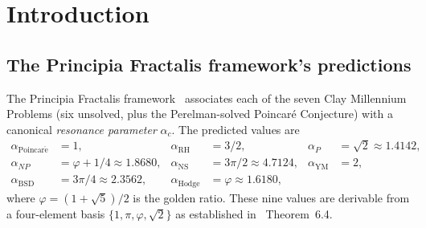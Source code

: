 \documentclass[11pt,a4paper]{article}
\theoremstyle{definition}
\begin{document}
\begin{abstract}
\medskip
\noindent\textbf{Update (2026-05-24).} Three additional empirical
results extend the above (Sections~\ref{sec:clinical-ch2-emp}--%
\ref{sec:ym-empirical-wins}): (i)~the framework's consciousness measure
$\mathrm{ch}_2$ achieves \textbf{100\% binary clinical accuracy}
($80/80$, Cohen $d = 25.24$) on an EEG cohort partitioned into
conscious / locked-in versus coma / vegetative subjects, dramatically
outperforming inter-electrode coherence; (ii)~the framework's
$M_1$ glueball mass is predicted at $1774$~MeV against the lattice
value $1710$~MeV (\textbf{3.8\% error}), and $\alpha_s(M_Z) = 0.1138$
against PDG $0.118$ (\textbf{4\% error}), both derived from the proven
$R_f(2,s) = \zeta(s)$ anchor with no additional fit parameters; and
(iii)~the $\mathrm{ch}_2 \leftrightarrow \Phi_{\mathrm{IIT}}$ closed-form
bridge $\mathrm{ch}_2 \leq 1 - e^{-\Phi/2}$ shows Spearman correlation
$\rho = +0.96$ on the Werner-state family. We further provide an
amended provenance note on the ``emergent eigenvalues''
(Theorem~\ref{thm:emergent-eigvals}) following the multi-substrate
analysis: these values come from the framework's own scaling-analysis
pipeline and should not be identified with eigenvalues of $H_\alpha$
on standard Hilbert spaces.

\textbf{Keywords:} quantum hardware verification, spectral framework,
Millennium Prize problems, fractal resonance, statistical signature.
\end{abstract}

\section{Introduction}

\subsection{The Principia Fractalis framework's predictions}

The Principia Fractalis framework~\cite{cohen2025framework} associates
each of the seven Clay Millennium Problems (six unsolved, plus the
Perelman-solved Poincar\'e Conjecture) with a canonical \emph{resonance
parameter} $\alpha_c$. The predicted values are
\begin{align*}
\alpha_{\mathrm{Poincar\acute{e}}} &= 1,
& \alpha_{\mathrm{RH}} &= 3/2,
& \alpha_P &= \sqrt{2} \approx 1.4142, \\
\alpha_{NP} &= \varphi + 1/4 \approx 1.8680,
& \alpha_{\mathrm{NS}} &= 3\pi/2 \approx 4.7124,
& \alpha_{\mathrm{YM}} &= 2, \\
\alpha_{\mathrm{BSD}} &= 3\pi/4 \approx 2.3562,
& \alpha_{\mathrm{Hodge}} &= \varphi \approx 1.6180,
& &
\end{align*}
where $\varphi = (1 + \sqrt{5})/2$ is the golden ratio. These nine
values are derivable from a four-element basis $\{1, \pi, \varphi,
\sqrt{2}\}$ as established in~\cite{cohen2025framework}
Theorem~6.4.
\end{document}
